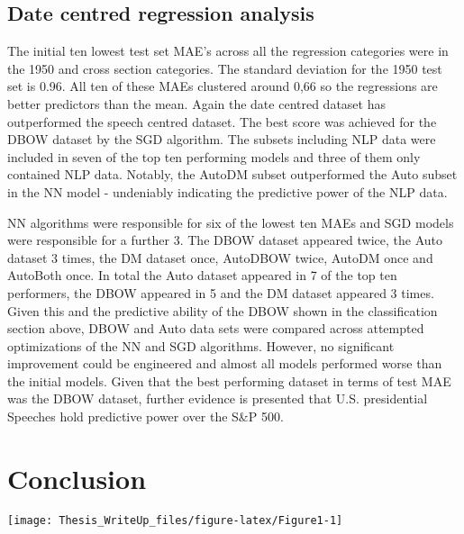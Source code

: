 \documentclass[11pt,preprint, authoryear]{elsarticle}
\let\origfigure\figure
\let\endorigfigure\endfigure
\renewenvironment{figure}[1][2] {
    \expandafter\origfigure\expandafter[H]
} {
    \endorigfigure
}
\numberwithin{equation}{section}
\numberwithin{figure}{section}
\numberwithin{table}{section}
\begin{document}
\hypertarget{date-centred-regression-analysis}{%
\subsection{Date centred regression
analysis}\label{date-centred-regression-analysis}}

The initial ten lowest test set MAE's across all the regression
categories were in the 1950 and cross section categories. The standard
deviation for the 1950 test set is 0.96. All ten of these MAEs clustered
around 0,66 so the regressions are better predictors than the mean.
Again the date centred dataset has outperformed the speech centred
dataset. The best score was achieved for the DBOW dataset by the SGD
algorithm. The subsets including NLP data were included in seven of the
top ten performing models and three of them only contained NLP data.
Notably, the AutoDM subset outperformed the Auto subset in the NN model
- undeniably indicating the predictive power of the NLP data.

NN algorithms were responsible for six of the lowest ten MAEs and SGD
models were responsible for a further 3. The DBOW dataset appeared
twice, the Auto dataset 3 times, the DM dataset once, AutoDBOW twice,
AutoDM once and AutoBoth once. In total the Auto dataset appeared in 7
of the top ten performers, the DBOW appeared in 5 and the DM dataset
appeared 3 times. Given this and the predictive ability of the DBOW
shown in the classification section above, DBOW and Auto data sets were
compared across attempted optimizations of the NN and SGD algorithms.
However, no significant improvement could be engineered and almost all
models performed worse than the initial models. Given that the best
performing dataset in terms of test MAE was the DBOW dataset, further
evidence is presented that U.S. presidential Speeches hold predictive
power over the S\&P 500.

\hypertarget{conclusion}{%
\section{Conclusion}\label{conclusion}}

\begin{figure}[H]

{\centering \texttt{[image: Thesis\_WriteUp\_files/figure-latex/Figure1-1]} 

}

\caption{Caption Here \label{Figure1}}\label{fig:Figure1}
\end{figure}
\end{document}

